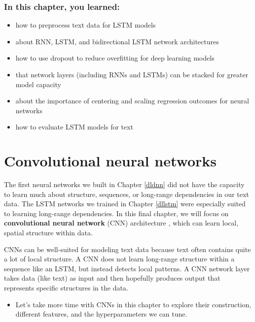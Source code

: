 \documentclass[
]{krantz}
\newenvironment{rmdblock}[1]
  {\begin{shaded*}
  \begin{itemize}[left = -1cm, labelsep = 1cm]
  \renewcommand{\labelitemi}{
    \raisebox{-.7\height}[0pt][0pt]{
      {\setkeys{Gin}{width=3em,keepaspectratio}\texttt{[image: images/\#1]}}
    }
  }
 
  \item
  }
  {
  \end{itemize}
  \end{shaded*}
  }
\newenvironment{rmdnote}
  {\begin{rmdblock}{note}}
  {\end{rmdblock}}
\begin{document}
\hypertarget{in-this-chapter-you-learned-8}{%
\subsection{In this chapter, you learned:}\label{in-this-chapter-you-learned-8}}

\begin{itemize}
\item
  how to preprocess text data for LSTM models
\item
  about RNN, LSTM, and bidirectional LSTM network architectures
\item
  how to use dropout to reduce overfitting for deep learning models
\item
  that network layers (including RNNs and LSTMs) can be stacked for greater model capacity
\item
  about the importance of centering and scaling regression outcomes for neural networks
\item
  how to evaluate LSTM models for text
\end{itemize}

\hypertarget{dlcnn}{%
\chapter{Convolutional neural networks}\label{dlcnn}}

The first neural networks we built in Chapter \ref{dldnn} did not have the capacity to learn much about structure, sequences, or long-range dependencies in our text data. The LSTM networks we trained in Chapter \ref{dllstm} were especially suited to learning long-range dependencies. In this final chapter, we will focus on  \textbf{convolutional neural network} (CNN) architecture \citep{kim2014}, which can learn local, spatial structure within data.

CNNs can be well-suited for modeling text data because text often contains quite a lot of local structure. A CNN does not learn long-range structure within a sequence like an LSTM, but instead detects local patterns. A CNN network layer takes data (like text) as input and then hopefully produces output that represents specific structures in the data.

\begin{rmdnote}
Let's take more time with CNNs in this chapter to explore their
construction, different features, and the hyperparameters we can tune.
\end{rmdnote}
\end{document}
